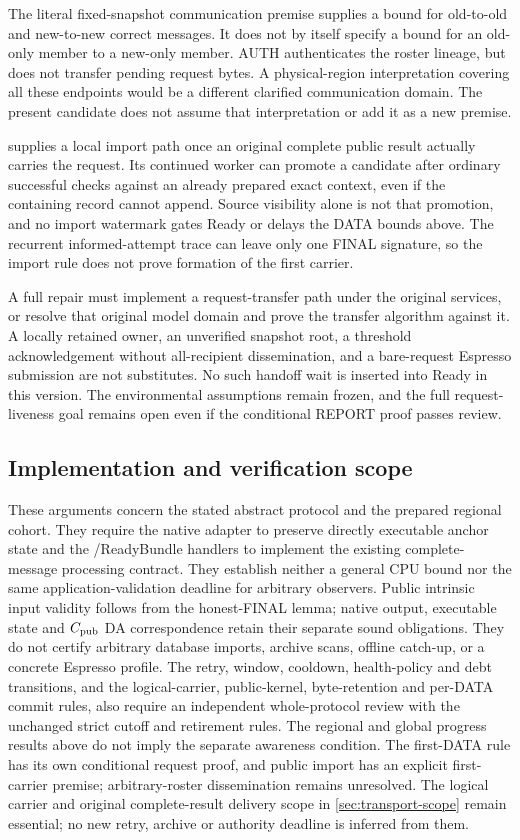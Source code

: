The literal fixed-snapshot communication premise supplies a bound for
old-to-old and new-to-new correct messages. It does not by itself specify
a bound for an old-only member to a new-only member. AUTH authenticates
the roster lineage, but does not transfer pending request bytes. A
physical-region interpretation covering all these endpoints would be
a different clarified communication domain. The present candidate does
not assume that interpretation or add it as a new premise.

 supplies a local import path
once an original complete public result actually carries the request.
Its continued worker can promote a candidate after ordinary successful
checks against an already prepared exact context, even if the containing
record cannot append. Source visibility alone is not that promotion,
and no import watermark gates Ready or delays the DATA bounds above.
The recurrent informed-attempt trace can leave only one FINAL signature,
so the import rule does not prove formation of the first carrier.

A full repair must implement a request-transfer path under the original
services, or resolve that original model domain and prove the transfer
algorithm against it. A locally retained owner, an unverified snapshot
root, a threshold acknowledgement without all-recipient dissemination,
and a bare-request Espresso submission are not substitutes. No such
handoff wait is inserted into Ready in this version. The environmental
assumptions remain frozen, and the full request-liveness goal remains
open even if the conditional REPORT proof passes review.

\subsection{Implementation and verification scope}
\label{sec:v35-progress-scope}
These arguments concern the stated abstract protocol and the prepared
regional cohort. They require the native adapter to preserve directly
executable anchor state and the /ReadyBundle handlers
to implement the existing complete-message processing contract. They
establish neither a general CPU bound nor the same application-validation
deadline for arbitrary observers. Public intrinsic input validity follows
from the honest-FINAL lemma; native output, executable state and
$C_{\rm pub}$ DA correspondence retain their separate sound obligations. They do not certify arbitrary database
imports, archive scans, offline catch-up, or a concrete Espresso profile.
The retry, window, cooldown, health-policy and debt transitions, and
the logical-carrier, public-kernel, byte-retention and per-DATA commit rules, also
require an independent whole-protocol review with the unchanged strict
cutoff and retirement rules. The regional and global progress results
above do not imply the separate awareness condition. The first-DATA
rule has its own conditional request proof, and public import has an
explicit first-carrier premise; arbitrary-roster dissemination
remains unresolved. The logical carrier and original complete-result delivery scope in
\cref{sec:transport-scope} remain essential; no new retry, archive or
authority deadline is inferred from them.
